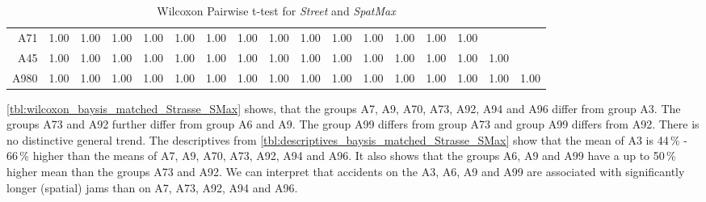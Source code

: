 \begin{table}[ht]
\begin{tabular}{rrrrrrrrrrrrrrrrr}
		A71 	& 1.00 & 1.00 & 1.00 & 1.00 & 1.00 & 1.00 & 1.00 & 1.00 & 1.00 & 1.00 & 1.00 & 1.00 & 1.00 & 1.00 &  &  \\ 
		A45 	& 1.00 & 1.00 & 1.00 & 1.00 & 1.00 & 1.00 & 1.00 & 1.00 & 1.00 & 1.00 & 1.00 & 1.00 & 1.00 & 1.00 & 1.00 &  \\ 
		A980 	& 1.00 & 1.00 & 1.00 & 1.00 & 1.00 & 1.00 & 1.00 & 1.00 & 1.00 & 1.00 & 1.00 & 1.00 & 1.00 & 1.00 & 1.00 & 1.00 \\ 
		\bottomrule
	\end{tabular}
	\caption{Wilcoxon Pairwise t-test for \textit{Street} and \textit{SpatMax}}
	\label{tbl:wilcoxon_baysis_matched_Strasse_SMax}
\end{table}
\autoref{tbl:wilcoxon_baysis_matched_Strasse_SMax} shows, that the groups A7, A9, A70, A73, A92, A94 and A96 differ from group A3. The groups A73 and A92 further differ from group A6 and A9. The group A99 differs from group A73 and group A99 differs from A92. There is no distinctive general trend. The descriptives from \autoref{tbl:descriptives_baysis_matched_Strasse_SMax} show that the mean of A3 is 44\,\% - 66\,\% higher than the means of A7, A9, A70, A73, A92, A94 and A96. It also shows that the groups A6, A9 and A99 have a up to 50\,\% higher mean than the groups A73 and A92. We can interpret that accidents on the A3, A6, A9 and A99 are associated with significantly longer (spatial) jams than on A7, A73, A92, A94 and A96.
